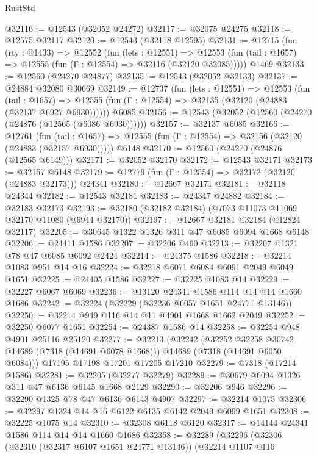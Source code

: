 \begin{lexlean}{RustStd}
\begin{coremodule}
@32116 := @12543 (@32052 @24272)
@32117 := @32075 @24275
@32118 := @12575 @32117
@32120 := @12543 (@32118 @12595)
@32131 := @12715
    (fun (rty : @1433) =>
    @12552
      (fun (lets : @12551) =>
      @12553 (fun (tail : @1657) => @12555 (fun (Γ : @12554) => @32116 (@32120 @32085)))))
    @1469
@32133 := @12560 (@24270 @24877)
@32135 := @12543 (@32052 @32133)
@32137 := @24884 @32080 @30669
@32149 := @12737
    (fun (lets : @12551) =>
    @12553
      (fun (tail : @1657) =>
      @12555 (fun (Γ : @12554) => @32135 (@32120 (@24883 (@32137 @6927 @6930))))))
    @6085
@32156 := @12543 (@32052 (@12560 (@24270 (@24876 (@12565 (@6086 @6930))))))
@32157 := @32137 @6085
@32166 := @12761
    (fun (tail : @1657) => @12555 (fun (Γ : @12554) => @32156 (@32120 (@24883 (@32157 @6930)))))
    @6148
@32170 := @12560 (@24270 (@24876 (@12565 @6149)))
@32171 := @32052 @32170
@32172 := @12543 @32171
@32173 := @32157 @6148
@32179 := @12779 (fun (Γ : @12554) => @32172 (@32120 (@24883 @32173))) @24341
@32180 := @12667 @32171
@32181 := @32118 @24344
@32182 := @12543 @32181
@32183 := @24347 @24882
@32184 := @32183 @32173
@32193 := @32180 (@32182 @32184) (@7073 @11073 @11069 @32170 @11080 (@6944 @32170))
@32197 := @12667 @32181 @32184 (@12824 @32117)
@32205 := @30645 @1322 @1326 @311 @47 @6085 @6094 @1668 @6148
@32206 := @24411 @1586
@32207 := @32206 @460
@32213 := @32207 @1321 @78 @47 @6085 @6092 @2424
@32214 := @24375 @1586
@32218 := @32214 @1083 @951 @14 @16
@32224 := @32218 @6071 @6084 @6091 @2049 @6049 @1651
@32225 := @24405 @1586
@32227 := @32225 @1083 @14
@32229 := @32227 @6067 @6069
@32236 := @13120 @24341 @1586 @114 @14 @14 @1660 @1686
@32242 := @32224 (@32229 (@32236 @6057 @1651 @24771 @13146))
@32250 := @32214 @949 @116 @14 @11 @4901 @1668 @1662 @2049
@32252 := @32250 @6077 @1651
@32254 := @24387 @1586 @14
@32258 := @32254 @948 @4901 @25116 @25120
@32277 := @32213
    (@32242
      (@32252 @32258 @30742 @14689 (@7318 (@14691 @6078 @1668)))
      @14689
      (@7318 (@14691 @6050 @6084)))
    @17195
    @17198
    @17201
    @17205
    @17210
@32279 := @7318 (@17214 @1586)
@32281 := @32205 (@32277 @32279)
@32289 := @30679 @6094 @1326 @311 @47 @6136 @6145 @1668 @2129
@32290 := @32206 @946
@32296 := @32290 @1325 @78 @47 @6136 @6143 @4907
@32297 := @32214 @1075
@32306 := @32297 @1324 @14 @16 @6122 @6135 @6142 @2049 @6099 @1651
@32308 := @32225 @1075 @14
@32310 := @32308 @6118 @6120
@32317 := @14144 @24341 @1586 @114 @14 @14 @1660 @1686
@32358 := @32289
    (@32296
      (@32306
        (@32310 (@32317 @6107 @1651 @24771 @13146))
        (@32214
          @1107
          @116

\end{coremodule}
\end{lexlean}

